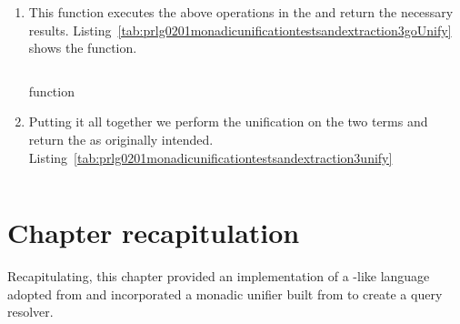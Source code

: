 \documentclass[thesis-solanki.tex]{subfiles}
\begin{document}
\begin{enumerate}
\item{}

This function executes the above operations in the  and return the necessary results.
Listing~\ref{tab:prlg0201monadicunificationtestsandextraction3goUnify} shows the  function.

\begin{code-list}[H]
  \begin{singlespace}
    \inputminted[linenos,firstline=95, lastline=107]{haskell}{haskell-proto2-monadic-unification-tests-and-extraction.hs}
  \end{singlespace}
\caption{ function}
\label{tab:prlg0201monadicunificationtestsandextraction3goUnify}
\end{code-list}

\item{}

Putting it all together we perform the unification on the two terms and return the  as originally intended.
Listing~\ref{tab:prlg0201monadicunificationtestsandextraction3unify}

\begin{code-list}[H]
  \begin{singlespace}
    \inputminted[linenos,firstline=121, lastline=130]{haskell}{haskell-proto2-monadic-unification-tests-and-extraction.hs}
  \end{singlespace}
\caption{}
\label{tab:prlg0201monadicunificationtestsandextraction3unify}
\end{code-list}


\end{enumerate}



\section{Chapter recapitulation}
Recapitulating, this chapter provided an implementation of a -like language adopted from
\cite{prolog-lib} and incorporated a monadic unifier built from \cite{unification-fd-lib} to create a
 query resolver.

\ifMain\ifDraft
\begin{scope}
  \nolinenumbers
  \enotesize
  \par
  \begin{singlespace}
  \setlength{\parskip}{12pt plus 2pt minus 1pt}
  \theendnotes
  \par
  \end{singlespace}
\end{scope}
\fi\fi
\end{document}
